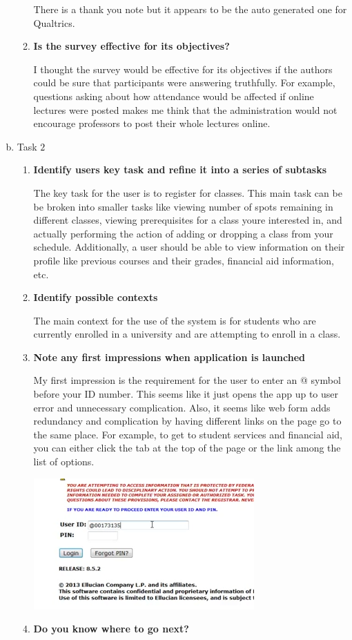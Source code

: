 \documentclass[11pt]{article}
\begin{document}
\begin{enumerate}[a)]
\begin{enumerate}[1)]
There is a thank you note but it appears to be the auto generated one for Qualtrics.  
\item \textbf{Is the survey effective for its objectives?}

I thought the survey would be effective for its objectives if the authors could be sure that participants were answering truthfully.  For example, questions asking about how attendance would be affected if online lectures were posted makes me think that the administration would not encourage professors to post their whole lectures online.  
\end{enumerate}

\item Task $2$
\begin{enumerate}[1)]
\item \textbf{Identify user\textquotesingle s key task and refine it into a series of subtasks}

The key task for the user is to register for classes.  This main task can be be broken into smaller tasks like viewing number of spots remaining in different classes, viewing prerequisites for a class you\textquotesingle re interested in, and actually performing the action of adding or dropping a class from your schedule.  Additionally, a user should be able to view information on their profile like previous courses and their grades, financial aid information, etc.  
\item \textbf{Identify possible contexts}

The main context for the use of the system is for students who are currently enrolled in a university and are attempting to enroll in a class.  
\item \textbf{Note any first impressions when application is launched}

My first impression is the requirement for the user to enter an @ symbol before your ID number.  This seems like it just opens the app up to user error and unnecessary complication.  Also, it seems like web form adds redundancy and complication by having different links on the page go to the same place.  For example, to get to student services and financial aid, you can either click the tab at the top of the page or the link among the list of options.  

\includegraphics[scale=0.5]{images/login}
\item \textbf{Do you know where to go next?}


\end{enumerate}
\end{enumerate}
\end{document}
